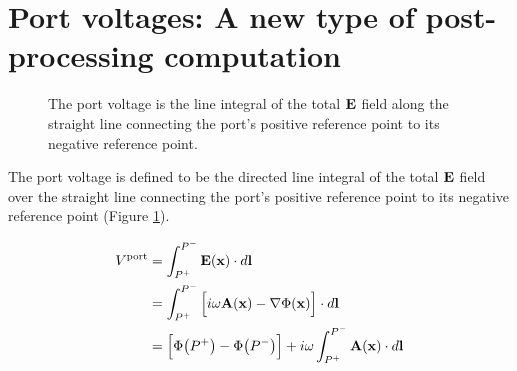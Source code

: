 \documentclass[letterpaper]{article}
\begin{document}
\newpage
\section{Port voltages: A new type of post-processing computation}
\begin{figure}
\begin{center}
\caption{The port voltage is the line integral of the total $\mathbf{E}$ 
         field along the straight line connecting the port's 
         positive reference point to its negative reference point.
        }
\label{LineIntegralFigure}
\end{center}
\end{figure}

\label{PortVoltageSection}

The port voltage is defined to be the directed line integral 
of the total $\mathbf{E}$ field over the straight line connecting
the port's positive reference point to its negative reference
point (Figure \ref{LineIntegralFigure}).

\begin{align*}
  V^{\hbox{\scriptsize{port}}}
&=\int_{P^+}^{P^-} \mathbf{E}(\mathbf{x}) \cdot d \mathbf{l} 
\\
&=\int_{P^+}^{P^-} \Big[ i\omega \mathbf{A}(\mathbf{x}) - \nabla \Phi(\mathbf{x})\Big]
                   \cdot d \mathbf{l}
\\
&= \Big[ \Phi\big(P^+\big) - \Phi\big(P^-\big)\Big]
   +i\omega \int_{P^+}^{P^-} \mathbf{A}(\mathbf{x}) \cdot d\mathbf{l}
\end{align*}
\end{document}
